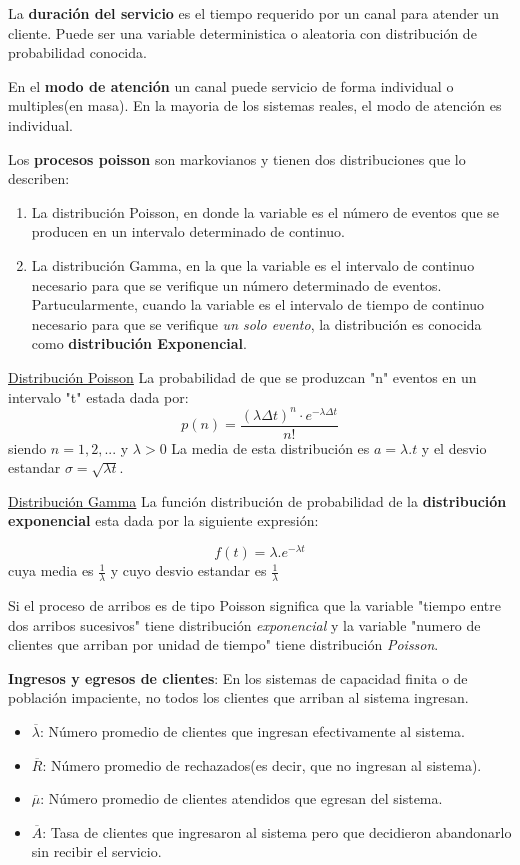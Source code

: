 \documentclass{article}
\begin{document}
La \textbf{duración del servicio} es el tiempo requerido por un canal para atender un cliente. Puede ser una variable deterministica o aleatoria con distribución de probabilidad conocida.

En el \textbf{modo de atención} un canal puede servicio de forma individual o multiples(en masa). En la mayoria de los sistemas reales, el modo de atención es individual.

Los \textbf{procesos poisson} son markovianos y tienen dos distribuciones que lo describen:
\begin{enumerate}
    \item La distribución Poisson, en donde la variable es el número de eventos que se producen en un intervalo determinado de continuo.
    \item La distribución Gamma, en la que la variable es el intervalo de continuo necesario para que se verifique un número determinado de eventos. Partucularmente, cuando la variable es el intervalo de tiempo de continuo necesario para que se verifique \textit{un solo evento}, la distribución es conocida como \textbf{distribución Exponencial}. 
\end{enumerate}

\underline{Distribución Poisson}
La probabilidad de que se produzcan "n" eventos en un intervalo "t" estada dada por:
\begin{equation}
    p(n)= \frac{( \lambda \Delta t) ^ { n } \cdot e^{ - \lambda \Delta t}}{n!}
\end{equation}
siendo \(n=1,2,...\) y \( \lambda > 0\)
La media de esta distribución es \(a = \lambda . t\) y el desvio estandar \(\sigma=\sqrt{\lambda t}\).

\underline{Distribución Gamma}
La función distribución de probabilidad de la \textbf{distribución exponencial} esta dada por la siguiente expresión:

\begin{equation}
    f(t) = \lambda . e^{-\lambda t}
\end{equation}
cuya media es \(\frac{1}{\lambda}\)
y cuyo desvio estandar es \(\frac{1}{\lambda}\)

Si el proceso de arribos es de tipo Poisson significa que la variable "tiempo entre dos arribos sucesivos" tiene distribución \textit{exponencial} y la variable "numero de clientes que arriban por unidad de tiempo" tiene distribución \textit{Poisson}.

\textbf{Ingresos y egresos de clientes}: 
En los sistemas de capacidad finita o de población impaciente, no todos los clientes que arriban al sistema ingresan.
\begin{itemize}
    \item $\overline{\lambda}$: Número promedio de clientes que ingresan efectivamente al sistema.
    \item $\overline{R}$: Número promedio de rechazados(es decir, que no ingresan al sistema).
    \item $\overline{\mu}$: Número promedio de clientes atendidos que egresan del sistema.
    \item $\overline{A}$: Tasa de clientes que ingresaron al sistema pero que decidieron abandonarlo sin recibir el servicio.
\end{itemize}
\end{document}
